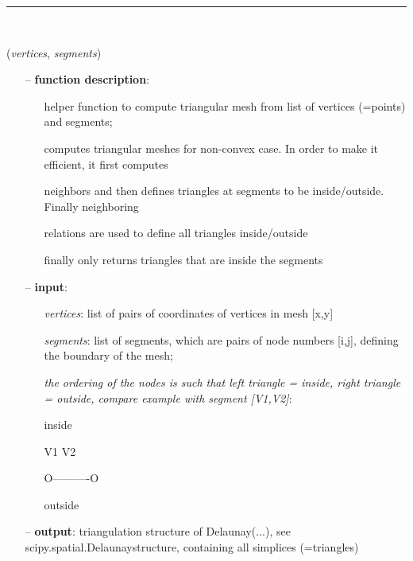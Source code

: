 \begin{itemize}[leftmargin=1.4cm]
\begin{itemize}[leftmargin=1.4cm]
\begin{itemize}[leftmargin=0.5cm]
\begin{itemize}[leftmargin=1.4cm]
\begin{itemize}[leftmargin=1.4cm]
\begin{itemize}[leftmargin=0.5cm]
\begin{itemize}[leftmargin=1.4cm]
\begin{itemize}[leftmargin=0.5cm]
%
\noindent\rule{8cm}{0.75pt}\vspace{1pt} \\ 
\begin{flushleft}
\label{sec:graphicsDataUtilities:ComputeTriangularMesh}
({\it vertices}, {\it segments})
\end{flushleft}
\setlength{\itemindent}{0.7cm}
\begin{itemize}[leftmargin=0.7cm]
\item[--]{\bf function description}: \vspace{-6pt}
\begin{itemize}[leftmargin=1.2cm]
\setlength{\itemindent}{-0.7cm}
\item[]helper function to compute triangular mesh from list of vertices (=points) and segments;
\item[]computes triangular meshes for non-convex case. In order to make it efficient, it first computes
\item[]neighbors and then defines triangles at segments to be inside/outside. Finally neighboring
\item[]relations are used to define all triangles inside/outside
\item[]finally only returns triangles that are inside the segments
\end{itemize}
\item[--]{\bf input}: \vspace{-6pt}
\begin{itemize}[leftmargin=1.2cm]
\setlength{\itemindent}{-0.7cm}
\item[]{\it vertices}: list of pairs of coordinates of vertices in mesh [x,y]
\item[]{\it segments}: list of segments, which are pairs of node numbers [i,j], defining the boundary of the mesh;
\item[]{\it the ordering of the nodes is such that left triangle = inside, right triangle = outside, compare example with segment [V1,V2]}:\\
\item[]inside
\item[]V1         V2
\item[]O----------O
\item[]outside
\end{itemize}
\item[--]{\bf output}: triangulation structure of Delaunay(...), see scipy.spatial.Delaunaystructure, containing all simplices (=triangles)

\end{itemize}
\end{itemize}
\end{itemize}
\end{itemize}
\end{itemize}
\end{itemize}
\end{itemize}
\end{itemize}
\end{itemize}
